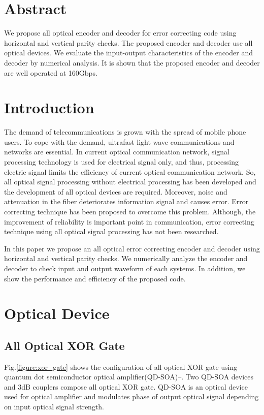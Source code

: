 \documentclass[twocolumn,a4paper]{article}
\begin{document}
\section*{Abstract}

We propose all optical encoder and decoder for error correcting code using horizontal and vertical parity checks. The proposed encoder and decoder use all optical devices. We evaluate the input-output characteristics of the encoder and decoder by numerical analysis. It is shown that the proposed encoder and decoder are well operated at 160Gbps.

\section{Introduction}
The demand of telecommunications is grown with the spread of mobile phone users. To cope with the demand, ultrafast light wave communications and networks are essential. In current optical communication network, signal processing technology is used for electrical signal only, and thus, processing electric signal limits the efficiency of current optical communication network{\cite{App}}. So, all optical signal processing  without electrical processing has been developed and the development of all optical devices are required. Moreover, noise and attenuation in the fiber deteriorates information signal and causes error. Error correcting technique has been proposed to overcome this problem. Although, the improvement of reliability is important point in communication, error correcting technique using all optical signal processing has not been researched.

In this paper we propose an all optical error correcting encoder and decoder using horizontal and vertical parity checks. We numerically analyze the encoder and decoder to check input and output waveform of each systems. In addition, we show the performance and efficiency of the proposed code.

\section{Optical Device}
\subsection{All Optical XOR Gate}
Fig.{\ref{figure:xor_gate}} shows the configuration of all optical XOR gate using quantum dot semiconductor optical amplifier(QD-SOA){\cite{Omar}}--{\cite{Ultrafast}}. Two QD-SOA devices and 3dB couplers compose all optical XOR gate. QD-SOA is an optical device used for optical amplifier and modulates phase of output optical signal depending on input optical signal strength.
\end{document}
